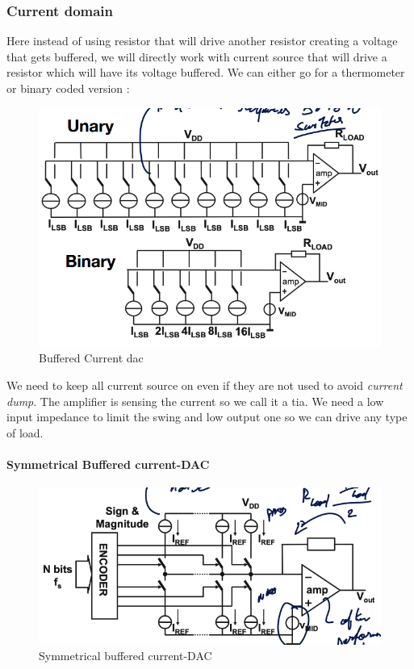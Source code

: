 \documentclass[
  a4paper,
]{article}
\begin{document}
\hypertarget{current-domain}{%
\subsubsection{Current domain}\label{current-domain}}

Here instead of using resistor that will drive another resistor creating
a voltage that gets buffered, we will directly work with current source
that will drive a resistor which will have its voltage buffered. We can
either go for a thermometer or binary coded version :

\begin{figure}
\hypertarget{fig:enter-label}{%
\centering
\includegraphics{img/Buffered_Current_DAC.png}
\caption{Buffered Current {dac}}\label{fig:enter-label}
}
\end{figure}

We need to keep all current source on even if they are not used to avoid
\emph{current dump}. The amplifier is sensing the current so we call it
a {tia}. We need a low input impedance to limit the swing and low output
one so we can drive any type of load.

\hypertarget{symmetrical-buffered-current-dac}{%
\paragraph{Symmetrical Buffered
current-DAC}\label{symmetrical-buffered-current-dac}}

\begin{figure}
\hypertarget{fig:sym-buffered-DAC-label}{%
\centering
\includegraphics{img/sym_dac.png}
\caption{Symmetrical buffered
current-DAC}\label{fig:sym-buffered-DAC-label}
}
\end{figure}
\end{document}
